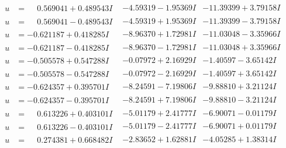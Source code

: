 \documentclass[1p]{elsarticle_modified}
\theoremstyle{definition}
\begin{document}
$$\begin{array}{c|c|c}
\begin{aligned}
u &= \phantom{-}0.569041 + 0.489543 I\end{aligned}
 & -4.59319 - 1.95369 I & -11.39399 + 3.79158 I \\ \hline\begin{aligned}
u &= \phantom{-}0.569041 - 0.489543 I\end{aligned}
 & -4.59319 + 1.95369 I & -11.39399 - 3.79158 I \\ \hline\begin{aligned}
u &= -0.621187 + 0.418285 I\end{aligned}
 & -8.96370 + 1.72981 I & -11.03048 - 3.35966 I \\ \hline\begin{aligned}
u &= -0.621187 - 0.418285 I\end{aligned}
 & -8.96370 - 1.72981 I & -11.03048 + 3.35966 I \\ \hline\begin{aligned}
u &= -0.505578 + 0.547288 I\end{aligned}
 & -0.07972 + 2.16929 I & -1.40597 - 3.65142 I \\ \hline\begin{aligned}
u &= -0.505578 - 0.547288 I\end{aligned}
 & -0.07972 - 2.16929 I & -1.40597 + 3.65142 I \\ \hline\begin{aligned}
u &= -0.624357 + 0.395701 I\end{aligned}
 & -8.24591 - 7.19806 I & -9.88810 + 3.21124 I \\ \hline\begin{aligned}
u &= -0.624357 - 0.395701 I\end{aligned}
 & -8.24591 + 7.19806 I & -9.88810 - 3.21124 I \\ \hline\begin{aligned}
u &= \phantom{-}0.613226 + 0.403101 I\end{aligned}
 & -5.01179 + 2.41777 I & -6.90071 - 0.01179 I \\ \hline\begin{aligned}
u &= \phantom{-}0.613226 - 0.403101 I\end{aligned}
 & -5.01179 - 2.41777 I & -6.90071 + 0.01179 I \\ \hline\begin{aligned}
u &= \phantom{-}0.274381 + 0.668482 I\end{aligned}
 & -2.83652 + 1.62881 I & -4.05285 + 1.38314 I \\ \hline\begin{aligned}

\end{aligned}
\end{array}$$
\end{document}

